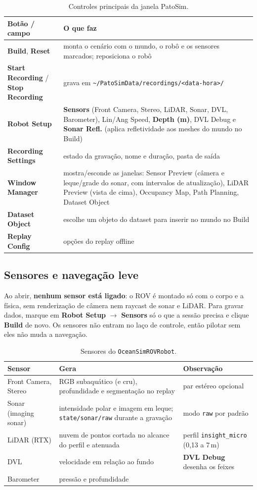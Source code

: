 \documentclass[10pt,a4paper]{article}
\newcommand{\arq}[1]{\texttt{#1}}
\newcommand{\botao}[1]{\textbf{#1}}
\begin{document}
\begin{table}[H]
\centering\small
\begin{tabularx}{\textwidth}{@{}lY@{}}
\toprule
Botão / campo & O que faz \\
\midrule
\botao{Build}, \botao{Reset} & monta o cenário com o mundo, o robô e os sensores marcados; reposiciona o robô \\
\botao{Start Recording} / \botao{Stop Recording} & grava em \arq{\textasciitilde/PatoSimData/recordings/<data-hora>/} \\
\botao{Robot Setup} & \textbf{Sensors} (Front Camera, Stereo, LiDAR, Sonar, DVL, Barometer), Lin/Ang Speed, \textbf{Depth (m)},
  DVL Debug e \textbf{Sonar Refl.} (aplica refletividade aos meshes do mundo no Build) \\
\botao{Recording Settings} & estado da gravação, nome e duração, pasta de saída \\
\botao{Window Manager} & mostra/esconde as janelas: Sensor Preview (câmera e leque/grade do sonar, com intervalos de
  atualização), LiDAR Preview (vista de cima), Occupancy Map, Path Planning, Dataset Object \\
\botao{Dataset Object} & escolhe um objeto do dataset para inserir no mundo no Build \\
\botao{Replay Config} & opções do replay offline \\
\bottomrule
\end{tabularx}
\caption{Controles principais da janela PatoSim.}
\end{table}

\subsection{Sensores e navegação leve}\label{sec:sensores}
Ao abrir, \textbf{nenhum sensor está ligado}: o ROV é montado só com o corpo e a física, sem renderização de câmera
nem raycast de sonar e LiDAR. Para gravar dados, marque em \botao{Robot Setup} $\rightarrow$ \textbf{Sensors} só o que a
sessão precisa e clique \botao{Build} de novo. Os sensores não entram no laço de controle, então pilotar sem eles
não muda a navegação.

\begin{table}[H]
\centering\small
\begin{tabularx}{\textwidth}{@{}lYY@{}}
\toprule
Sensor & Gera & Observação \\
\midrule
Front Camera, Stereo & RGB subaquático (e cru), profundidade e segmentação no replay & par estéreo opcional \\
Sonar (imaging sonar) & intensidade polar e imagem em leque; \arq{state/sonar/raw} durante a gravação & modo \texttt{raw} por padrão \\
LiDAR (RTX) & nuvem de pontos cortada no alcance do perfil e atenuada & perfil \texttt{insight\_micro} (0,13 a 7\,m) \\
DVL & velocidade em relação ao fundo & \textbf{DVL Debug} desenha os feixes \\
Barometer & pressão e profundidade & \\
\bottomrule
\end{tabularx}
\caption{Sensores do \arq{OceanSimROVRobot}.}
\end{table}
\end{document}
